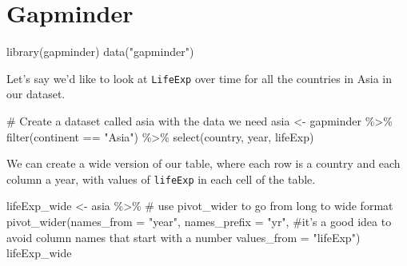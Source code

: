 \documentclass[
  letterpaper,
  DIV=11,
  numbers=noendperiod]{scrartcl}
\newenvironment{Shaded}{\begin{snugshade}}{\end{snugshade}}
\newcommand{\AttributeTok}[1]{\textcolor[rgb]{0.40,0.45,0.13}{#1}}
\newcommand{\CommentTok}[1]{\textcolor[rgb]{0.37,0.37,0.37}{#1}}
\newcommand{\FunctionTok}[1]{\textcolor[rgb]{0.28,0.35,0.67}{#1}}
\newcommand{\NormalTok}[1]{\textcolor[rgb]{0.00,0.23,0.31}{#1}}
\newcommand{\OtherTok}[1]{\textcolor[rgb]{0.00,0.23,0.31}{#1}}
\newcommand{\SpecialCharTok}[1]{\textcolor[rgb]{0.37,0.37,0.37}{#1}}
\newcommand{\StringTok}[1]{\textcolor[rgb]{0.13,0.47,0.30}{#1}}
\begin{document}
\hypertarget{gapminder}{%
\section{Gapminder}\label{gapminder}}

\begin{Shaded}
\begin{Highlighting}[]
\FunctionTok{library}\NormalTok{(gapminder)}
\FunctionTok{data}\NormalTok{(}\StringTok{"gapminder"}\NormalTok{)}
\end{Highlighting}
\end{Shaded}

Let's say we'd like to look at \texttt{LifeExp} over time for all the
countries in Asia in our dataset.

\begin{Shaded}
\begin{Highlighting}[]
\CommentTok{\# Create a dataset called asia with the data we need}
\NormalTok{asia }\OtherTok{\textless{}{-}}\NormalTok{ gapminder }\SpecialCharTok{\%\textgreater{}\%} 
  \FunctionTok{filter}\NormalTok{(continent }\SpecialCharTok{==} \StringTok{"Asia"}\NormalTok{) }\SpecialCharTok{\%\textgreater{}\%} 
  \FunctionTok{select}\NormalTok{(country, year, lifeExp)}
\end{Highlighting}
\end{Shaded}

We can create a wide version of our table, where each row is a country
and each column a year, with values of \texttt{lifeExp} in each cell of
the table.

\begin{Shaded}
\begin{Highlighting}[]
\NormalTok{lifeExp\_wide }\OtherTok{\textless{}{-}}\NormalTok{ asia }\SpecialCharTok{\%\textgreater{}\%} 
  \CommentTok{\# use pivot\_wider to go from long to wide format}
  \FunctionTok{pivot\_wider}\NormalTok{(}\AttributeTok{names\_from =} \StringTok{"year"}\NormalTok{, }
              \AttributeTok{names\_prefix =} \StringTok{"yr"}\NormalTok{, }\CommentTok{\#it’s a good idea to avoid column names that start with a number}
              \AttributeTok{values\_from =} \StringTok{"lifeExp"}\NormalTok{)}
\NormalTok{lifeExp\_wide}
\end{Highlighting}
\end{Shaded}
\end{document}
